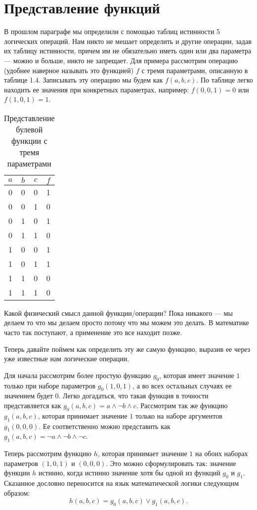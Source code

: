 \section{Представление функций}

В прошлом параграфе мы определили с помощью таблиц истинности 5 логических операций. Нам никто не мешает определить и другие операции, задав их таблицу истинности, причем им не обязательно иметь один или два параметра — можно и больше, никто не запрещает. Для примера рассмотрим операцию (удобнее наверное называть это функцией) $f$ с тремя параметрами, описанную в таблице 1.4. Записывать эту операцию мы будем как $f(a, b, c)$. По таблице легко находить ее значения при конкретных параметрах, например: $f(0,0,1) = 0$ или $f(1,0,1) = 1$.

\begin{table}[h]
\centering
\begin{tabular}{ccc|c}
$a$&$b$&$c$&$f$\\
\hline
0&0&0&1\\
0&0&1&0\\
0&1&0&1\\
0&1&1&0\\
1&0&0&1\\
1&0&1&1\\
1&1&0&0\\
1&1&1&0
\end{tabular}
\caption{Представление булевой функции с тремя параметрами}
\end{table}

Какой физический смысл данной функции/операции? Пока никакого — мы делаем то что мы делаем просто потому что мы можем это делать. В математике часто так поступают, а применение это все находит позже.

Теперь давайте поймем как определить эту же самую функцию, выразив ее через уже известные нам логические операции.

Для начала рассмотрим более простую функцию $g_0$, которая имеет значение $1$ только при наборе параметров $g_0(1, 0, 1)$, а во всех остальных случаях ее значением будет $0$. Легко догадаться, что такая функция в точности представляется как $g_0(a, b, c) = a\wedge \neg b \wedge c$. Рассмотрим так же функцию $g_1(a, b, c)$, которая принимает значение $1$ только на наборе аргументов $g_1(0, 0, 0)$. Ее соответственно можно представить как $g_1(a, b, c) = \neg a \wedge \neg b \wedge \neg c$.

Теперь рассмотрим функцию $h$, которая принимает значение $1$ на обоих наборах параметров $(1, 0, 1)$ и $(0, 0, 0)$. Это можно сформулировать так:   значение функции $h$ истинно, когда истинно значение хотя бы одной из функций $g_0$ и $g_1$. Сказанное дословно переносится на язык математической логики следующим образом: $$h(a, b, c) = g_0(a, b, c) \vee g_1(a, b, c).$$

